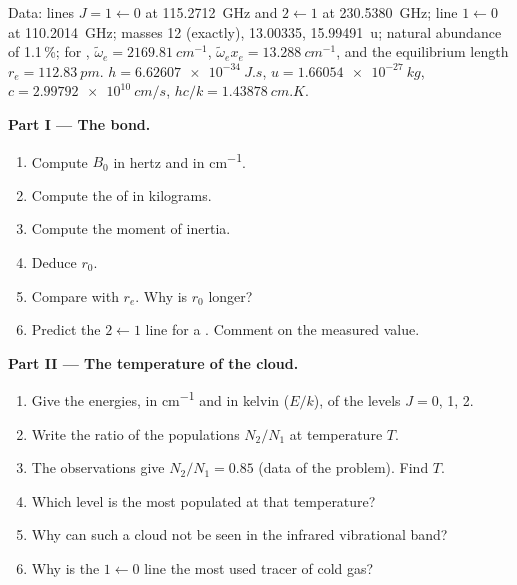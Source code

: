 \begin{problem}
\label{pb:b3:rovibrational-spectroscopy:1}
Data:  lines $J = 1 \leftarrow 0$ at \qty{115.2712}{GHz} and $2
\leftarrow 1$ at \qty{230.5380}{GHz};  line $1 \leftarrow 0$ at
\qty{110.2014}{GHz}; masses  12 (exactly),  13.00335,
 \qty{15.99491}{u}; natural abundance of  1.1\,\%; for ,
$\tilde\omega_e = \qty{2169.81}{cm^{-1}}$, $\tilde\omega_ex_e = \qty{13.288}{cm^{-1}}$, and the
equilibrium length $r_e = \qty{112.83}{pm}$. $h = \qty{6.62607e-34}{J.s}$, $u =
\qty{1.66054e-27}{kg}$, $c = \qty{2.99792e10}{cm/s}$, $hc/k = \qty{1.43878}{cm.K}$.

\medskip\noindent\textbf{Part I --- The bond.}
\begin{enumerate}
  \item Compute $B_0$ in hertz and in \unit{cm^{-1}}.
  \item Compute the  of  in kilograms.
  \item Compute the moment of inertia.
  \item Deduce $r_0$.
  \item Compare with $r_e$. Why is $r_0$ longer?
  \item Predict the $2 \leftarrow 1$ line for a . Comment on the
        measured value.
\end{enumerate}

\medskip\noindent\textbf{Part II --- The temperature of the cloud.}
\begin{enumerate}[resume]
  \item Give the energies, in \unit{cm^{-1}} and in kelvin ($E/k$), of the levels $J =
        0$, 1, 2.
  \item Write the ratio of the populations $N_2/N_1$ at temperature $T$.
  \item The observations give $N_2/N_1 = 0.85$ (data of the problem). Find $T$.
  \item Which level is the most populated at that temperature?
  \item Why can such a cloud not be seen in the infrared vibrational band?
  \item Why is the $1 \leftarrow 0$ line the most used tracer of cold gas?
\end{enumerate}


\end{problem}
